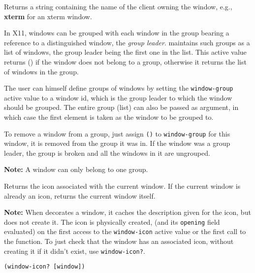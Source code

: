         

Returns a string containing the name of the client owning the window, e.g.,
{\bf xterm} for an xterm window.

        

In X11, windows can be grouped with each window in the group bearing a
reference to a distinguished window, the {\em group leader}. {\GWM}
maintains such groups as a list of windows, the group leader being the first
one in the list. This active value returns () if the window does not belong
to a group, otherwise it returns 
the list of windows in the group.

The user can himself define groups of windows by setting the
\verb"window-group" active value to a window id, which is the group leader
to which the window should be grouped. The entire group (list) can also be
passed as argument, in which case the first element is taken as
the window to be grouped to.

To remove a window from a group, just assign \verb"()" to
\verb"window-group" for this window, it is removed from the group it
was in. If the window was a group leader, the group is broken and all
the windows in it are ungrouped.

{\bf Note:}  A window can only belong to one group.

        

Returns the icon associated with the current window. If the current window
is already an icon, returns the current window itself.

{\bf Note:} When {\GWM} decorates a window, it caches the {\WOOL}
description given for the icon, but does not create it. The icon is
physically created, (and its \verb"opening" field evaluated) on the first
access to the \verb"window-icon" active value or the first call to the
 function. To just check that the window has an associated
icon, without creating it if it didn't exist, use \verb|window-icon?|.


{\usagefont\begin{verbatim}
(window-icon? [window])
\end{verbatim}}\usageupspace

